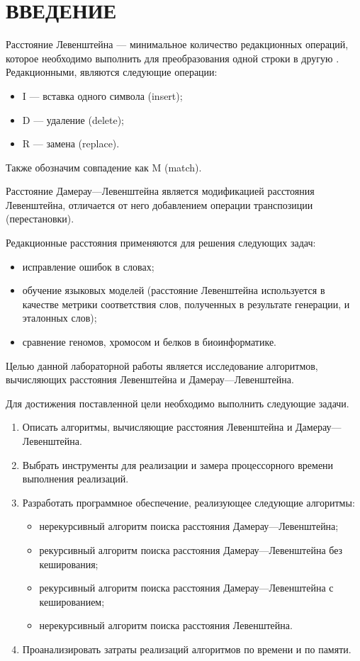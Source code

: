 \chapter*{ВВЕДЕНИЕ}

Расстояние Левенштейна --- минимальное количество редакционных операций, которое необходимо выполнить для преобразования одной строки в другую \cite{levenshtein}. 
Редакционными, являются следующие операции: 
\begin{itemize}
	\item I --- вставка одного символа (insert);
	\item D --- удаление (delete);
	\item R --- замена (replace).
\end{itemize}
Также обозначим совпадение как M (match).

Расстояние Дамерау---Левенштейна является модификацией расстояния Левенштейна, отличается от него добавлением операции транспозиции (перестановки).  

Редакционные расстояния применяются для решения следующих задач:
\begin{itemize}
	\item исправление ошибок в словах;
	\item обучение языковых моделей (расстояние Левенштейна используется в качестве метрики соответствия слов, полученных в результате генерации, и эталонных слов);
	\item сравнение геномов, хромосом и белков в биоинформатике.
\end{itemize}

Целью данной лабораторной работы является исследование алгоритмов, вычисляющих расстояния Левенштейна и Дамерау---Левенштейна.

Для достижения поставленной цели необходимо выполнить следующие задачи.
\begin{enumerate}
	\item Описать алгоритмы, вычисляющие расстояния Левенштейна и Дамерау---Левенштейна.
	\item Выбрать инструменты для реализации и замера процессорного времени выполнения реализаций.
	\item Разработать программное обеспечение, реализующее следующие алгоритмы:
	\begin{itemize}
		\item нерекурсивный алгоритм поиска расстояния Дамерау---Левенштейна;
		\item рекурсивный алгоритм поиска расстояния Дамерау---Левенштейна без кеширования;
		\item рекурсивный алгоритм поиска расстояния Дамерау---Левенштейна с кешированием;
		\item нерекурсивный алгоритм поиска расстояния Левенштейна.
	\end{itemize}
	\item Проанализировать затраты реализаций алгоритмов по времени и по памяти.
\end{enumerate}
